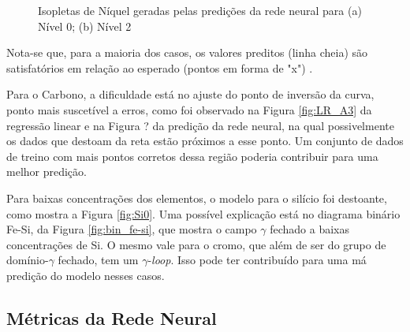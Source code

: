\documentclass[brazil,tf,epusp]{usp}  %
\begin{document}
\begin{figure}
\caption{Isopletas de Níquel geradas pelas predições da rede neural para (a) Nível 0; (b) Nível 2 }
\label{fig:Ni_NN_isop}
\end{figure}

Nota-se que, para a maioria dos casos, os valores preditos (linha cheia) são satisfatórios em relação ao esperado (pontos em forma de "x") .

Para o Carbono, a dificuldade está no ajuste do ponto de inversão da curva, ponto mais suscetível a erros, como foi observado na Figura \ref{fig:LR_A3} da regressão linear e na Figura ? da predição da rede neural, na qual possivelmente os dados que destoam da reta estão próximos a esse ponto. Um conjunto de dados de treino com mais pontos corretos dessa região poderia contribuir para uma melhor predição.

Para baixas concentrações dos elementos, o modelo para o silício foi destoante, como mostra a Figura \ref{fig:Si0}. Uma possível explicação está no diagrama binário Fe-Si, da Figura \ref{fig:bin_fe-si}, que mostra o campo $\gamma$ fechado a baixas concentrações de Si. O mesmo vale para o cromo, que além de ser do grupo de domínio-$\gamma$ fechado, tem um $\gamma$-\textit{loop}. Isso pode ter contribuído para uma má predição do modelo nesses casos.

\subsection{Métricas da Rede Neural}
\end{document}
